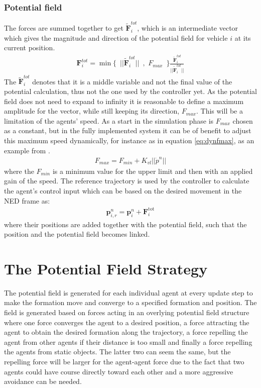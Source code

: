 \documentclass[conference]{IEEEtran}
\begin{document}
\subsubsection{Potential field}
The forces are summed together to get $\tilde{\mathbf{F}}_i^{tot}$,
which is an intermediate vector which gives the magnitude and
direction of the potential field for vehicle $i$ at its current
position.
\begin{align}
  \mathbf{F}_i^{tot} = \min\{\,\,\,||\tilde{\mathbf{F}}_i^{tot}||\,\,\,,\,\,F_{max}\,\,\,\}\frac{\tilde{\mathbf{F}}_i^{tot}}{||\tilde{\mathbf{F}}_i^{tot}||}
\end{align}
The $\tilde{\mathbf{F}}_i^{tot}$ denotes that it is a middle variable
and not the final value of the potential calculation, thus not the one
used by the controller yet.  As the potential field does not need to
expand to infinity it is reasonable to define a maximum amplitude for
the vector, while still keeping its direction, $F_{max}$. This will be
a limitation of the agents' speed. As a start in the simulation phase
is $F_{max}$ chosen as a constant, but in the fully implemented system
it can be of benefit to adjust this maximum speed dynamically, for
instance as in equation \ref{eq:dynfmax}, as an example from
\citep{UAVff3dpf}.
\begin{align}
F_{max} = F_{min} + K_{vl}||\dot{p}^n||
\label{eq:dynfmax}
\end{align}
where the $F_{min}$ is a minimum value for the upper limit and then
with an applied gain of the speed.  The reference trajectory is used
by the controller to calculate the agent's control input which can be
based on the desired movement in the NED frame as:
\begin{align}
  \mathbf{p}_{i,r}^n = \mathbf{p}_i^n + \mathbf{F}_i ^\text{tot}
\end{align}
where their positions are added together with the potential field,
such that the position and the potential field becomes linked.

\section{The Potential Field Strategy}
 The potential field is
generated for each individual agent at every update step to make the
formation move and converge to a specified formation and position. The
field is generated based on forces acting in an overlying potential
field structure where one force converges the agent to a desired
position, a force attracting the agent to obtain the desired formation
along the trajectory, a force repelling the agent from other agents if
their distance is too small and finally a force repelling the agents
from static objects. The latter two can seem the same, but the
repelling force will be larger for the agent-agent force due to the
fact that two agents could have course directly toward each other and
a more aggressive avoidance can be needed.
\end{document}
